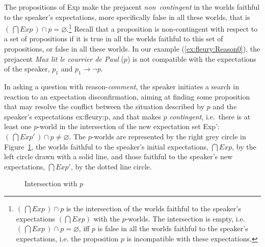 \documentclass[output=paper,colorlinks,citecolor=brown,
]{langscibook}
\begin{document}
The propositions of Exp make the prejacent \textit{non~contingent} 
in the worlds faithful to the speaker's expectations, more specifically false in all these worlds, that is $(\,\bigcap Exp\,) \cap p = \varnothing$.\footnote{$(\,\bigcap Exp\,) \cap p$ is the intersection of the worlds faithful to the speaker's expectations $(\bigcap Exp)$ with the $p$-worlds.
The intersection is empty, i.e. $(\,\bigcap Exp\,) \cap p = \varnothing$, iff $p$ is false in all the worlds faithful to the speaker's expectations, i.e. the proposition $p$ is incompatible with these expectations.}
Recall that a proposition is non-contingent with respect to a set of propositions if it is true in all the worlds faithful to this set of propositions, or false in all these worlds.
In our example (\ref{ex:fleury:Reason0}),
the prejacent \textit{Max lit le courrier de Paul} ($p$) is not compatible with the expectations of the speaker, $p_1$ and $p_1 \rightarrow \neg p$.

In asking a question with reason-\textit{comment},
the speaker initiates a  search  in reaction to an expectation disconfirmation, 
aiming at finding some proposition that may resolve the conflict
 between the situation described by $p$ and the speaker's expectations {ex:fleury:p}, and 
that 
makes $p$ \textit{contingent}, i.e.\ there is at least one $p$-world in the intersection of the new expectation set Exp':
$(\,\bigcap Exp'\,) \cap p \neq \varnothing$.
The $p$-worlds are represented by the right grey %
circle in Figure~\ref{fig:fleury:intersecp},
the worlds faithful to the speaker's initial expectations, $\bigcap Exp$, by the
left
circle drawn with a solid line, and those faithful to the speaker's new expectations, $\bigcap Exp'$, by the dotted line circle. %

\begin{figure}
\caption{Intersection with $p$}
\label{fig:fleury:intersecp}
\def\ellipseP{(8.8,2) circle (2cm)}
\def\circleExp{(2,2.2) circle (3.8cm)}
\def\circleExpPrime{(4.4,0.9) circle (4cm)}
\def\circleQ{(6.3,1.3) circle (2.5cm)}
%
\def\noeudP{(11.1,3.3) node {$p$}}
\def\noeudExp{(-2.9,-0.3) node {$\bigcap Exp$}}
\def\noeudExpPrime{(8.8,-2.6) node {$\bigcap Exp'$}}
\def\noeudQ{(7.5,4) node {$q$}}
%
\end{figure}
\end{document}
